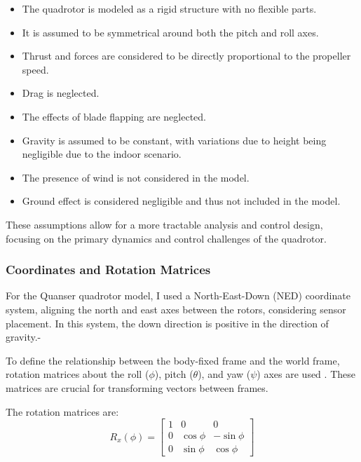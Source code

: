 \documentclass{UoNMCHA}
\numberwithin{equation}{section}
\begin{document}
\begin{itemize}
    \item The quadrotor is modeled as a rigid structure with no flexible parts.
    \item It is assumed to be symmetrical around both the pitch and roll axes.
    \item Thrust and forces are considered to be directly proportional to the propeller speed.
    \item Drag is neglected.
    \item The effects of blade flapping are neglected.
    \item Gravity is assumed to be constant, with variations due to height being negligible due to the indoor scenario.
    \item The presence of wind is not considered in the model.
    \item Ground effect is considered negligible and thus not included in the model.
\end{itemize}

These assumptions allow for a more tractable analysis and control design, focusing on the primary dynamics and control challenges of the quadrotor.

\subsubsection{Coordinates and Rotation Matrices}

For the Quanser quadrotor model, I used a North-East-Down (NED) coordinate system, aligning the north and east axes between the rotors, considering sensor placement. In this system, the down direction is positive in the direction of gravity.-

To define the relationship between the body-fixed frame and the world frame, rotation matrices about the roll (\(\phi\)), pitch (\(\theta\)), and yaw (\(\psi\)) axes are used \cite{website:RotationMatricies}. These matrices are crucial for transforming vectors between frames.

The rotation matrices are:
\begin{equation}
    R_x(\phi) = \begin{bmatrix}
    1 & 0 & 0 \\
    0 & \cos\phi & -\sin\phi \\
    0 & \sin\phi & \cos\phi
    \end{bmatrix}
    \label{eq:rotation_matrix_x}
    \end{equation}
    
\end{document}
